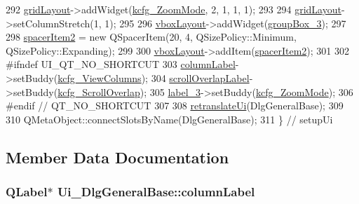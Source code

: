 \begin{DoxyCode}
292         \hyperlink{classUi__DlgGeneralBase_ae149cf7331bb8bdd9c3f8dabdde003e4}{gridLayout}->addWidget(\hyperlink{classUi__DlgGeneralBase_af20043c0fdfcbff439c8741e096ac60a}{kcfg\_ZoomMode}, 2, 1, 1, 1);
293 
294         \hyperlink{classUi__DlgGeneralBase_ae149cf7331bb8bdd9c3f8dabdde003e4}{gridLayout}->setColumnStretch(1, 1);
295 
296         \hyperlink{classUi__DlgGeneralBase_ad85268c43c0919c56230704be03f092c}{vboxLayout}->addWidget(\hyperlink{classUi__DlgGeneralBase_a14484da34e83830a42cd4929ba2c7d86}{groupBox\_3});
297 
298         \hyperlink{classUi__DlgGeneralBase_ab4e46a31ba4402dd7204018103a9e68c}{spacerItem2} = \textcolor{keyword}{new} QSpacerItem(20, 4, QSizePolicy::Minimum, QSizePolicy::Expanding);
299 
300         \hyperlink{classUi__DlgGeneralBase_ad85268c43c0919c56230704be03f092c}{vboxLayout}->addItem(\hyperlink{classUi__DlgGeneralBase_ab4e46a31ba4402dd7204018103a9e68c}{spacerItem2});
301 
302 \textcolor{preprocessor}{#ifndef UI\_QT\_NO\_SHORTCUT}
303         \hyperlink{classUi__DlgGeneralBase_ad6a70134bad0df0f344b5ec449ad9995}{columnLabel}->setBuddy(\hyperlink{classUi__DlgGeneralBase_a8951356ecfac9ee4a27ea0b2bca2e12e}{kcfg\_ViewColumns});
304         \hyperlink{classUi__DlgGeneralBase_afd8162f00985b598c6b44fea18d59add}{scrollOverlapLabel}->setBuddy(\hyperlink{classUi__DlgGeneralBase_aa5ddc567f8fc39c1a159749c0c4bd718}{kcfg\_ScrollOverlap});
305         \hyperlink{classUi__DlgGeneralBase_a0b095fda3a8dd7228b68c9fe8515afe3}{label\_3}->setBuddy(\hyperlink{classUi__DlgGeneralBase_af20043c0fdfcbff439c8741e096ac60a}{kcfg\_ZoomMode});
306 \textcolor{preprocessor}{#endif // QT\_NO\_SHORTCUT}
307 
308         \hyperlink{classUi__DlgGeneralBase_a6040814bf756535c48fc3691f48b2213}{retranslateUi}(DlgGeneralBase);
309 
310         QMetaObject::connectSlotsByName(DlgGeneralBase);
311     \} \textcolor{comment}{// setupUi}
\end{DoxyCode}


\subsection{Member Data Documentation}
\hypertarget{classUi__DlgGeneralBase_ad6a70134bad0df0f344b5ec449ad9995}{
\subsubsection[{column\+Label}]{\setlength{\rightskip}{0pt plus 5cm}Q\+Label$\ast$ Ui\+\_\+\+Dlg\+General\+Base\+::column\+Label}}\label{classUi__DlgGeneralBase_ad6a70134bad0df0f344b5ec449ad9995}


